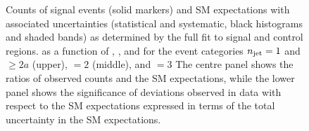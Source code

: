 \begin{figure}
\begin{center}
  \caption{Counts of signal events (solid markers) and SM expectations
    with associated uncertainties (statistical and systematic, black
    histograms and shaded bands) 
    as determined by the full fit to signal and control regions.
    as a function of \nb, \scalht, and \mht for the event categories
    $n_{\text{jet}} = 1$ and ${\geq}2a$ (upper), $=2$ (middle), and $=3$
    The centre panel shows the ratios of
    observed counts and the SM expectations, while the lower panel
    shows the significance of deviations observed in data with respect
    to the SM expectations expressed in terms of the total uncertainty
    in the SM expectations.
    }
        \label{fig:T1qqqqLL_full-fit_123}
    \end{center}
\end{figure}

